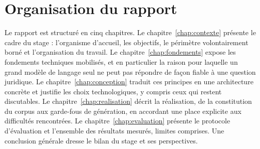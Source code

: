 \section*{Organisation du rapport}

Le rapport est structuré en cinq chapitres. Le
chapitre~\ref{chap:contexte} présente le cadre du stage : l'organisme d'accueil, les objectifs,
le périmètre volontairement borné et l'organisation du travail. Le chapitre~\ref{chap:fondements}
expose les fondements techniques mobilisés, et en particulier la raison pour laquelle un grand
modèle de langage seul ne peut pas répondre de façon fiable à une question juridique. Le
chapitre~\ref{chap:conception} traduit ces principes en une architecture concrète et justifie les
choix technologiques, y compris ceux qui restent discutables. Le chapitre~\ref{chap:realisation}
décrit la réalisation, de la constitution du corpus aux garde-fous de génération, en accordant
une place explicite aux difficultés rencontrées. Le chapitre~\ref{chap:evaluation} présente le
protocole d'évaluation et l'ensemble des résultats mesurés, limites comprises. Une conclusion
générale dresse le bilan du stage et ses perspectives.
